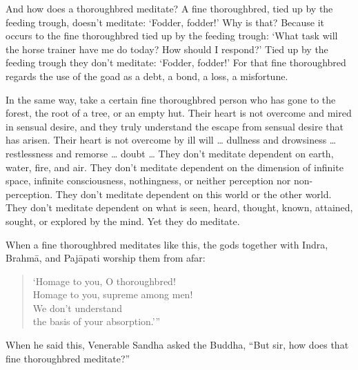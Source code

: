 \documentclass[12pt,openany]{book}%
\begin{document}
And how does a thoroughbred meditate? A fine thoroughbred, tied up by the feeding trough, doesn’t meditate: ‘Fodder, fodder!’ Why is that? Because it occurs to the fine thoroughbred tied up by the feeding trough: ‘What task will the horse trainer have me do today? How should I respond?’ Tied up by the feeding trough they don’t meditate: ‘Fodder, fodder!’ For that fine thoroughbred regards the use of the goad as a debt, a bond, a loss, a misfortune. 

In the same way, take a certain fine thoroughbred person who has gone to the forest, the root of a tree, or an empty hut. Their heart is not overcome and mired in sensual desire, and they truly understand the escape from sensual desire that has arisen. Their heart is not overcome by ill will … dullness and drowsiness … restlessness and remorse … doubt … They don’t meditate dependent on earth, water, fire, and air. They don’t meditate dependent on the dimension of infinite space, infinite consciousness, nothingness, or neither perception nor non-perception. They don’t meditate dependent on this world or the other world. They don’t meditate dependent on what is seen, heard, thought, known, attained, sought, or explored by the mind. Yet they do meditate. 

When a fine thoroughbred meditates like this, the gods together with Indra, \textsanskrit{Brahmā}, and \textsanskrit{Pajāpati} worship them from afar: 

\begin{verse}%
‘Homage to you, O thoroughbred! \\
Homage to you, supreme among men! \\
We don’t understand \\
the basis of your absorption.’” 

%
\end{verse}

When he said this, Venerable Sandha asked the Buddha, “But sir, how does that fine thoroughbred meditate?” 
\end{document}
